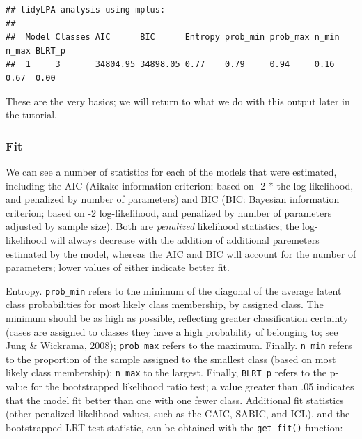 \documentclass[man]{apa6}
\newenvironment{Shaded}{\begin{snugshade}}{\end{snugshade}}
\newcommand{\DataTypeTok}[1]{\textcolor[rgb]{0.13,0.29,0.53}{#1}}
\newcommand{\DecValTok}[1]{\textcolor[rgb]{0.00,0.00,0.81}{#1}}
\newcommand{\KeywordTok}[1]{\textcolor[rgb]{0.13,0.29,0.53}{\textbf{#1}}}
\newcommand{\NormalTok}[1]{#1}
\newcommand{\OperatorTok}[1]{\textcolor[rgb]{0.81,0.36,0.00}{\textbf{#1}}}
\newcommand{\StringTok}[1]{\textcolor[rgb]{0.31,0.60,0.02}{#1}}
\begin{document}
\begin{Shaded}
\end{Shaded}

\begin{verbatim}
## tidyLPA analysis using mplus: 
## 
##  Model Classes AIC      BIC      Entropy prob_min prob_max n_min n_max BLRT_p
##  1     3       34804.95 34898.05 0.77    0.79     0.94     0.16  0.67  0.00
\end{verbatim}

These are the very basics; we will return to what we do with this output later in the tutorial.

\hypertarget{fit}{%
\subsubsection{Fit}\label{fit}}

We can see a number of statistics for each of the models that were estimated, including the
AIC (Aikake information criterion; based on -2 * the log-likelihood, and penalized by number of parameters) and BIC (BIC: Bayesian information criterion; based on -2 log-likelihood, and penalized by number of parameters adjusted by sample size). Both are \emph{penalized} likelihood statistics; the log-likelihood will always decrease with the addition of additional
paremeters estimated by the model, whereas the AIC and BIC will account for the number of parameters; lower values of
either indicate better fit.

Entropy. \texttt{prob\_min} refers to the minimum of the diagonal of the average latent class probabilities for most likely class membership, by assigned class. The minimum should be as high as possible, reflecting greater classification certainty (cases are assigned to classes they have a high probability of belonging to; see Jung \& Wickrama, 2008); \texttt{prob\_max}
refers to the maximum. Finally. \texttt{n\_min} refers to the proportion of the sample assigned to the smallest class (based on most likely class membership); \texttt{n\_max} to the largest. Finally, \texttt{BLRT\_p} refers to the p-value for the bootstrapped likelihood ratio test; a value greater than .05 indicates that the model fit better than one with one fewer class.
Additional fit statistics (other penalized likelihood values, such as the CAIC, SABIC, and ICL), and the bootstrapped LRT
test statistic, can be obtained with the \texttt{get\_fit()} function:
\end{document}
